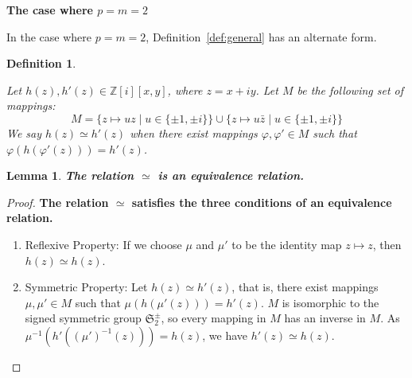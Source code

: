 \documentclass[12pt]{article}
\newtheorem{lemma}[theorem]{Lemma}
\newtheorem{definition}[theorem]{Definition}
\numberwithin{equation}{section}
\newcommand{\MySectionSpacing}{15}
\newcommand{\MySectionFontSize}{40}
\begin{document}
\begin{landscape}
{{\newpage

\noindent
\begin{center}
{\fontsize{\MySectionFontSize}{\MySectionSpacing}\selectfont \textbf
 {The case where \( p = m = 2\)}
}
\end{center}

In the case where \( p = m = 2\), Definition~\ref{def:general} has an alternate form.



\begin{definition}
\label{def:2D}

Let \( h(z), h'(z) \in \mathbb{Z} [i][x,y] \),
where \( z = x + iy \).
Let \( M \) be the following set of mappings: 
\[
M = \{ z \mapsto uz \mid u \in \{ \pm 1, \pm i \} \}  
\cup \{ z\mapsto u \bar{z} \mid u \in \{ \pm 1, \pm i \} \}  
\]
We say \( h(z) \simeq h'(z) \) when there exist mappings \( \varphi, \varphi' \in M \)
such that \( \varphi( h( \varphi'( z ) ) )  = h'(z) \).


\end{definition}

\begin{lemma}
\bf
The relation \( \simeq \) is an equivalence relation.
\end{lemma}

\begin{proof}
\bf
The relation \( \simeq \) satisfies the three conditions of an equivalence relation.
\begin{enumerate}
\item Reflexive Property: If we choose \( \mu \) and \( \mu'\) to be the identity map \( z \mapsto z \), 
then \( h(z) \simeq h(z) \).

\item Symmetric Property: Let  \( h(z) \simeq h'(z) \), that is, there exist mappings 
\( \mu, \mu' \in M \)
such that \( \mu( h( \mu'( z ) ) )  = h'(z) \).
\(M\) is isomorphic to the signed symmetric group \( \mathfrak{S}_2^\pm \), so every mapping in \(M\)
has an inverse in \(M\). As  \( \mu^{-1}( h'( (\mu')^{-1}( z ) ) )  = h(z) \),
we have \( h'(z) \simeq h(z) \).


\end{enumerate}
\end{proof}}}
\end{landscape}
\end{document}
